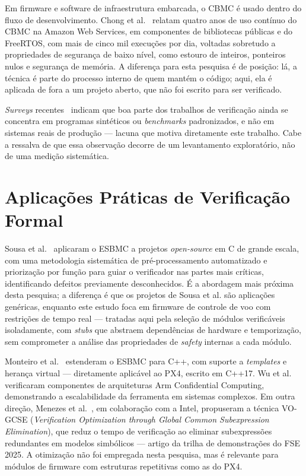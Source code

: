 Em firmware e software de infraestrutura embarcada, o CBMC é usado dentro do fluxo de
desenvolvimento. Chong et al.~\cite{Chong2020} relatam quatro anos de uso
contínuo do CBMC na Amazon Web Services, em componentes de bibliotecas públicas e do
FreeRTOS, com mais de cinco mil execuções por dia, voltadas sobretudo a propriedades
de segurança de baixo nível, como estouro de inteiros, ponteiros nulos e segurança de
memória. A diferença para esta pesquisa é de posição: lá, a técnica é parte do processo
interno de quem mantém o código; aqui, ela é aplicada de fora a um projeto aberto,
que não foi escrito para ser verificado.

\textit{Surveys} recentes~\cite{Beyer2022, Beyer2024} indicam que boa parte dos
trabalhos de verificação ainda se concentra em programas sintéticos ou
\textit{benchmarks} padronizados, e não em sistemas reais de produção --- lacuna
que motiva diretamente este trabalho. Cabe a ressalva de que essa observação
decorre de um levantamento exploratório, não de uma medição sistemática.

\section{Aplicações Práticas de Verificação Formal}
\label{sec:rel-praticas}

Sousa et al.~\cite{Sousa2026} aplicaram o ESBMC a projetos \textit{open-source}
em C de grande escala, com uma metodologia sistemática de pré-processamento
automatizado e priorização por função para guiar o verificador nas partes mais
críticas, identificando defeitos previamente desconhecidos. É a abordagem mais
próxima desta pesquisa; a diferença é que os projetos de Sousa et al. são
aplicações genéricas, enquanto este estudo foca em firmware de controle de voo
com restrições de tempo real --- tratadas aqui pela seleção de módulos
verificáveis isoladamente, com \textit{stubs} que abstraem dependências de
hardware e temporização, sem comprometer a análise das propriedades de
\textit{safety} internas a cada módulo.

Monteiro et al.~\cite{Monteiro2022} estenderam o ESBMC para C++, com suporte a
\textit{templates} e herança virtual --- diretamente aplicável ao PX4, escrito em
C++17. Wu et al.~\cite{Wu2024} verificaram componentes de arquiteturas Arm
Confidential Computing, demonstrando a escalabilidade da ferramenta em sistemas
complexos. Em outra direção, Menezes et al.~\cite{Menezes2025GCSE}, em
colaboração com a Intel, propuseram a técnica VO-GCSE (\textit{Verification
Optimization through Global Common Subexpression Elimination}), que reduz o tempo
de verificação ao eliminar subexpressões redundantes em modelos simbólicos ---
artigo da trilha de demonstrações do FSE 2025. A otimização não foi empregada
nesta pesquisa, mas é relevante para módulos de firmware com estruturas
repetitivas como as do PX4. 

